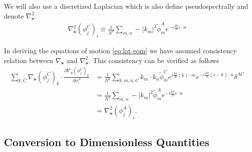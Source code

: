 We will also use a discretized Laplacian which is also define pseudospectrally and denote $\nabla^2_\lat$.
\begin{align}
  \nabla^2_\lat(\phi^C_j)_i \equiv \frac{1}{N^3} \sum_{m,n} -|k_m|^2 \tilde{\phi}^A_m e^{-i\frac{2\pi}{N}i\cdot n}
\end{align}

In deriving the equations of motion \eqref{eq:lat eom} we have assumed consistency relation between $\nabla_\lat$ and $\nabla^2_\lat$. This consistency can be verified as follows
\begin{align}
  \sum_{k,C}\nabla_\lat(\phi^C_j)_k \cdot \frac{\partial\nabla_\lat(\phi^C_j)_k}{\partial\phi^A_i}
  &= \frac{1}{N^6} \sum_{k,m,n,C} k_m\cdot k_n \tilde{\phi}^C_m e^{i\frac{2\pi}{N}(k)\cdot m} e^{-i\frac{2\pi}{N}(i-k)\cdot n} \delta^{AC} \\
  &= \frac{1}{N^3} \sum_{m,n} -|k_m|^2 \tilde{\phi}^A_m e^{-i\frac{2\pi}{N}i\cdot n} \\
  &= \nabla^2_\lat(\phi^A_j)_i.
\end{align}

\subsection{Conversion to Dimensionless Quantities}
